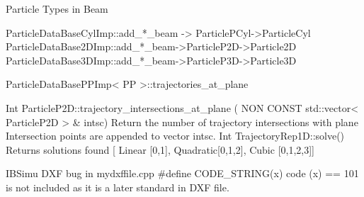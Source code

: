 \documentclass[12pt,a4paper]{article}
\begin{document}
Particle Types in Beam

ParticleDataBaseCylImp::add\_*\_beam -> ParticlePCyl->ParticleCyl
ParticleDataBase2DImp::add\_*\_beam->ParticleP2D->Particle2D
ParticleDataBase3DImp::add\_*\_beam->ParticleP3D->Particle3D



ParticleDataBasePPImp< PP >::trajectories\_at\_plane 


Int ParticleP2D::trajectory\_intersections\_at\_plane
( NON CONST	std::vector< ParticleP2D > \& 	intsc)
Return the number of trajectory intersections with plane
Intersection points are appended to vector intsc.
Int TrajectoryRep1D::solve()
Returns solutions found [ Linear [0,1], Quadratic[0,1,2], Cubic [0,1,2,3]]

IBSimu DXF bug in mydxffile.cpp \#define CODE\_STRING(x) code (x) == 101 is not included as it is a later standard in DXF file.
\end{document}
